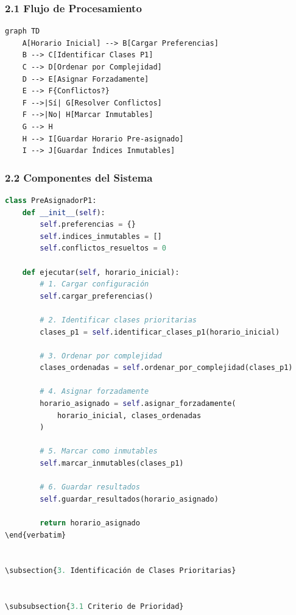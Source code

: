 \begin{itemize}
\begin{itemize}
\begin{itemize}
\begin{itemize}
\begin{itemize}
\begin{itemize}
\begin{enumerate}
\begin{enumerate}
\begin{enumerate}
\begin{enumerate}
\subsubsection{2.1 Flujo de Procesamiento}

\begin{verbatim}
graph TD
    A[Horario Inicial] --> B[Cargar Preferencias]
    B --> C[Identificar Clases P1]
    C --> D[Ordenar por Complejidad]
    D --> E[Asignar Forzadamente]
    E --> F{Conflictos?}
    F -->|Sí| G[Resolver Conflictos]
    F -->|No| H[Marcar Inmutables]
    G --> H
    H --> I[Guardar Horario Pre-asignado]
    I --> J[Guardar Índices Inmutables]
\end{verbatim}


\subsubsection{2.2 Componentes del Sistema}

\begin{lstlisting}[language=Python]
class PreAsignadorP1:
    def __init__(self):
        self.preferencias = {}
        self.indices_inmutables = []
        self.conflictos_resueltos = 0
    
    def ejecutar(self, horario_inicial):
        # 1. Cargar configuración
        self.cargar_preferencias()
        
        # 2. Identificar clases prioritarias
        clases_p1 = self.identificar_clases_p1(horario_inicial)
        
        # 3. Ordenar por complejidad
        clases_ordenadas = self.ordenar_por_complejidad(clases_p1)
        
        # 4. Asignar forzadamente
        horario_asignado = self.asignar_forzadamente(
            horario_inicial, clases_ordenadas
        )
        
        # 5. Marcar como inmutables
        self.marcar_inmutables(clases_p1)
        
        # 6. Guardar resultados
        self.guardar_resultados(horario_asignado)
        
        return horario_asignado
\end{verbatim}


\subsection{3. Identificación de Clases Prioritarias}


\subsubsection{3.1 Criterio de Prioridad}


\end{lstlisting}
\end{enumerate}
\end{enumerate}
\end{enumerate}
\end{enumerate}
\end{itemize}
\end{itemize}
\end{itemize}
\end{itemize}
\end{itemize}
\end{itemize}
